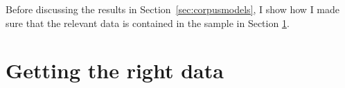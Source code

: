 \documentclass[USenglish]{article}
\begin{document}



Before discussing the results in Section~\ref{sec:corpusmodels}, I show how I made sure that the relevant data is contained in the sample in Section \ref{sec:gettingdata}.

\section{Getting the right data}
\label{sec:gettingdata}

\end{document}
